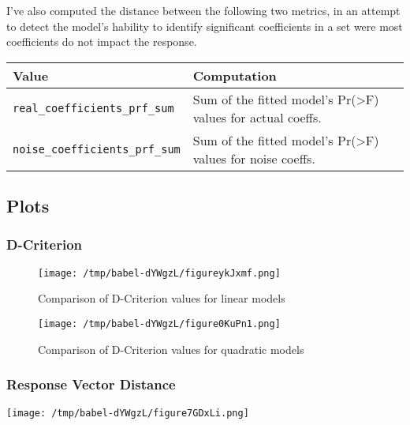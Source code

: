 \documentclass[11pt]{article}
\begin{document}
I've also computed the distance between the following two metrics, in an attempt
to detect the model's hability to identify significant coefficients in a set
were most coefficients do not impact the response.

\begin{center}
\begin{tabular}{ll}
Value & Computation\\
\hline
\texttt{real\_coefficients\_prf\_sum} & Sum of the fitted model's Pr(>F) values for actual coeffs.\\
\texttt{noise\_coefficients\_prf\_sum} & Sum of the fitted model's Pr(>F) values for noise coeffs.\\
\end{tabular}
\end{center}

\subsection{Plots}
\label{sec:org28322bd}
\subsubsection{D-Criterion}
\label{sec:org036bedb}
\begin{figure}[htbp]
\centering
\texttt{[image: /tmp/babel-dYWgzL/figureykJxmf.png]}
\caption{\label{fig:org555a593}
Comparison of D-Criterion values for linear models}
\end{figure}

\begin{figure}[htbp]
\centering
\texttt{[image: /tmp/babel-dYWgzL/figure0KuPn1.png]}
\caption{\label{fig:orgc747392}
Comparison of D-Criterion values for quadratic models}
\end{figure}

\subsubsection{Response Vector Distance}
\label{sec:org05bdbde}
\begin{center}
\texttt{[image: /tmp/babel-dYWgzL/figure7GDxLi.png]}
\end{center}
\end{document}
